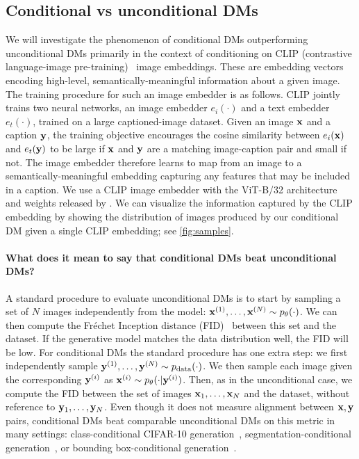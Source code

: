 \subsection{Conditional vs unconditional DMs} \label{sec:2sdm-cond-vs-uncond-dgms}

We will investigate the phenomenon of conditional DMs outperforming unconditional DMs primarily in the context of conditioning on CLIP (contrastive language-image pre-training)~\citep{radford2021learning} image embeddings. These are embedding vectors encoding high-level, semantically-meaningful information about a given image. The training procedure for such an image embedder is as follows. CLIP jointly trains two neural networks, an image embedder $e_i(\cdot)$ and a text embedder $e_t(\cdot)$, trained on a large captioned-image dataset. Given an image ${\mathbf{x}}$ and a caption ${\mathbf{y}}$, the training objective encourages the cosine similarity between $e_i({\mathbf{x}})$ and $e_t({\mathbf{y}})$ to be large if ${\mathbf{x}}$ and ${\mathbf{y}}$ are a matching image-caption pair and small if not.
The image embedder therefore learns to map from an image to a semantically-meaningful embedding capturing any features that may be included in a caption. We use a CLIP image embedder with the ViT-B/32 architecture and weights released by \citet{radford2021learning}. We can visualize the information captured by the CLIP embedding by showing the distribution of images produced by our conditional DM given a single CLIP embedding; see \cref{fig:samples}.

\paragraph{What does it mean to say that conditional DMs beat unconditional DMs?} A standard procedure to evaluate unconditional DMs is to start by sampling a set of $N$ images independently from the model: ${{\mathbf{x}}^{(1)},\ldots,{\mathbf{x}}^{(N)} \sim p_\theta(\cdot)}$. We can then compute the Fr\'echet Inception distance (FID)~\citep{heusel2017gans} between this set and the dataset. If the generative model matches the data distribution well, the FID will be low.
%
For conditional DMs the standard procedure has one extra step: we first independently sample ${{\mathbf{y}}^{(1)},\ldots,{\mathbf{y}}^{(N)} \sim p_{\rm{data}}(\cdot)}$. We then sample each image given the corresponding ${\mathbf{y}}^{(i)}$ as ${{\mathbf{x}}^{(i)} \sim p_\theta(\cdot|{\mathbf{y}}^{(i)})}$. 
%
Then, as in the unconditional case, we compute the FID between the set of images ${\mathbf{x}}_1,\ldots,{\mathbf{x}}_N$ and the dataset, without reference to ${\mathbf{y}}_1,\ldots,{\mathbf{y}}_N$. Even though it does not measure alignment between ${\mathbf{x}}, {\mathbf{y}}$ pairs, conditional DMs beat comparable unconditional DMs on this metric in many settings: class-conditional CIFAR-10 generation~\citep{karras2022elucidating}, segmentation-conditional generation~\citep{hu2022self}, or bounding box-conditional generation~\citep{hu2022self}.

